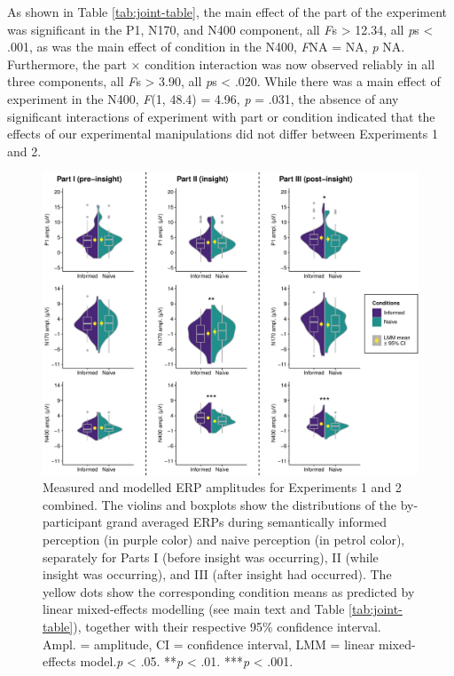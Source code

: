 \documentclass[
  english,
  man,11pt,floatsintext]{apa7}
\begin{document}
As shown in Table \ref{tab:joint-table}, the main effect of the part of the experiment was significant in the P1, N170, and N400 component, all \emph{F}s \textgreater{} 12.34, all \emph{p}s \textless{} .001, as was the main effect of condition in the N400, \emph{F}NA = NA, \emph{p} NA. Furthermore, the part × condition interaction was now observed reliably in all three components, all \emph{F}s \textgreater{} 3.90, all \emph{p}s \textless{} .020. While there was a main effect of experiment in the N400, \emph{F}(1, 48.4) = 4.96, \emph{p} = .031, the absence of any significant interactions of experiment with part or condition indicated that the effects of our experimental manipulations did not differ between Experiments 1 and 2.



\begin{figure}

{\centering \includegraphics[width=1\linewidth]{manuscript_files/figure-latex/joint-plot-1} 

}

\caption{Measured and modelled ERP amplitudes for Experiments 1 and 2 combined. The violins and boxplots show the distributions of the by-participant grand averaged ERPs during semantically informed perception (in purple color) and naive perception (in petrol color), separately for Parts I (before insight was occurring), II (while insight was occurring), and III (after insight had occurred). The yellow dots show the corresponding condition means as predicted by linear mixed-effects modelling (see main text and Table \ref{tab:joint-table}), together with their respective 95\% confidence interval. Ampl. = amplitude, CI = confidence interval, LMM = linear mixed-effects model.\newline*\emph{p} \textless{} .05. **\emph{p} \textless{} .01. ***\emph{p} \textless{} .001.}\label{fig:joint-plot}
\end{figure}
\end{document}
